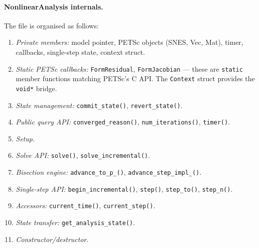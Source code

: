 \paragraph{NonlinearAnalysis internals.}
The file is organised as follows:
\begin{enumerate}[nosep]
  \item \emph{Private members:} model pointer, PETSc objects (SNES, Vec, Mat),
        timer, callbacks, single-step state, context struct.
  \item \emph{Static PETSc callbacks:} \texttt{FormResidual}, \texttt{FormJacobian}
        --- these are \texttt{static} member functions matching PETSc's C API.
        The \texttt{Context} struct provides the \texttt{void*} bridge.
  \item \emph{State management:} \texttt{commit\_state()}, \texttt{revert\_state()}.
  \item \emph{Public query API:} \texttt{converged\_reason()},
        \texttt{num\_iterations()}, \texttt{timer()}.
  \item \emph{Setup.}
  \item \emph{Solve API:} \texttt{solve()}, \texttt{solve\_incremental()}.
  \item \emph{Bisection engine:} \texttt{advance\_to\_p\_()},
        \texttt{advance\_step\_impl\_()}.
  \item \emph{Single-step API:} \texttt{begin\_incremental()}, \texttt{step()},
        \texttt{step\_to()}, \texttt{step\_n()}.
  \item \emph{Accessors:} \texttt{current\_time()}, \texttt{current\_step()}.
  \item \emph{State transfer:} \texttt{get\_analysis\_state()}.
  \item \emph{Constructor/destructor.}
\end{enumerate}

